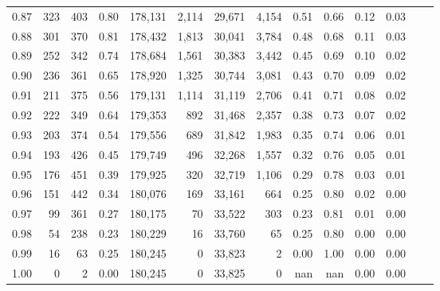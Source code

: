 \begin{tabular}{rrrrrrrrrrrrrr}
0.87 &    323 &  403 &    0.80 &  178,131 &    2,114 &  29,671 &   4,154 &  0.51 &  0.66 &  0.12 &      0.03 \\
0.88 &    301 &  370 &    0.81 &  178,432 &    1,813 &  30,041 &   3,784 &  0.48 &  0.68 &  0.11 &      0.03 \\
0.89 &    252 &  342 &    0.74 &  178,684 &    1,561 &  30,383 &   3,442 &  0.45 &  0.69 &  0.10 &      0.02 \\
0.90 &    236 &  361 &    0.65 &  178,920 &    1,325 &  30,744 &   3,081 &  0.43 &  0.70 &  0.09 &      0.02 \\
0.91 &    211 &  375 &    0.56 &  179,131 &    1,114 &  31,119 &   2,706 &  0.41 &  0.71 &  0.08 &      0.02 \\
0.92 &    222 &  349 &    0.64 &  179,353 &      892 &  31,468 &   2,357 &  0.38 &  0.73 &  0.07 &      0.02 \\
0.93 &    203 &  374 &    0.54 &  179,556 &      689 &  31,842 &   1,983 &  0.35 &  0.74 &  0.06 &      0.01 \\
0.94 &    193 &  426 &    0.45 &  179,749 &      496 &  32,268 &   1,557 &  0.32 &  0.76 &  0.05 &      0.01 \\
0.95 &    176 &  451 &    0.39 &  179,925 &      320 &  32,719 &   1,106 &  0.29 &  0.78 &  0.03 &      0.01 \\
0.96 &    151 &  442 &    0.34 &  180,076 &      169 &  33,161 &     664 &  0.25 &  0.80 &  0.02 &      0.00 \\
0.97 &     99 &  361 &    0.27 &  180,175 &       70 &  33,522 &     303 &  0.23 &  0.81 &  0.01 &      0.00 \\
0.98 &     54 &  238 &    0.23 &  180,229 &       16 &  33,760 &      65 &  0.25 &  0.80 &  0.00 &      0.00 \\
0.99 &     16 &   63 &    0.25 &  180,245 &        0 &  33,823 &       2 &  0.00 &  1.00 &  0.00 &      0.00 \\
1.00 &      0 &    2 &    0.00 &  180,245 &        0 &  33,825 &       0 &   nan &   nan &  0.00 &      0.00 \\
\bottomrule
\end{tabular}
